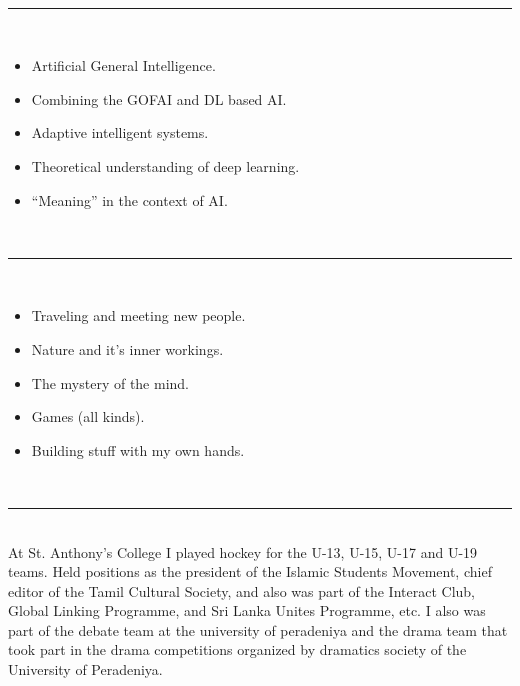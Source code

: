 \documentclass[a4paper,11pt]{article}
\begin{document}
\vspace{15pt}
\begin{minipage}[t]{0.5\linewidth}
\noindent\textbf{\color{MidnightBlue}\large{}}
\vspace{-8pt}\noindent\\\rule{0.75\textwidth}{0.4pt}\\
\vspace{-15pt}
\begin{itemize}
  \setlength\itemsep{-2pt}
\item Artificial General Intelligence.
\item Combining the GOFAI and DL based AI.
\item Adaptive intelligent systems.
\item Theoretical understanding of deep learning.
\item ``Meaning'' in the context of AI.
\end{itemize}
\end{minipage}
\begin{minipage}[t]{0.5\linewidth}
\noindent\textbf{\color{MidnightBlue}\large{}}
\vspace{-8pt}\noindent\\\rule{0.75\textwidth}{0.4pt}\\
\vspace{-15pt}
\begin{itemize}
  \setlength\itemsep{-2pt}
\item Traveling and meeting new people.
\item Nature and it's inner workings.
\item The mystery of the mind.
\item Games (all kinds).
\item Building stuff with my own hands.
\end{itemize}
\end{minipage}

\vspace{15pt}
\noindent\textbf{\color{MidnightBlue}\large{}}
\vspace{-8pt}\noindent\\\rule{0.75\textwidth}{0.4pt}\\
At St. Anthony’s College I played hockey for the U-13, U-15, U-17 and U-19 teams. Held positions as the president of the Islamic Students Movement, chief editor of the Tamil Cultural Society, and also was part of the Interact Club, Global Linking Programme, and Sri Lanka Unites Programme, etc. I also was part of the debate team at the university of peradeniya and the drama team that took part in the drama competitions organized by dramatics society of the University of Peradeniya.
\end{document}
